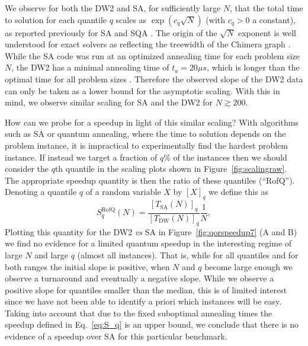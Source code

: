 We observe for both the DW2 and SA, for sufficiently large $N$, that the total time to solution for each quantile $q$ scales as $\exp(c_q\sqrt{N})$ (with $c_q>0$ a constant), as reported previously for SA and SQA \cite{ourpaper}. The origin of the $\sqrt{N}$ exponent is well understood for exact solvers as reflecting the treewidth of the Chimera graph \cite{SM,Choi2}. While the SA code was run at an optimized annealing time for each problem size $N$, the DW2 has a minimal annealing time of $t_a=20\mu s$, which is longer than the optimal time for all problem sizes \cite{SM}. Therefore the observed slope of the DW2 data can only be taken as a lower bound for the asymptotic scaling. With this in mind, we observe similar scaling for SA and the DW2 for $N\gtrsim 200$.

How can we probe for a speedup in light of this similar scaling? With algorithms such as SA or quantum annealing, where the time to solution depends on the problem instance, it is impractical to experimentally find the hardest problem instance. If instead we target a fraction of $q$\% of the instances then we should consider the $q$th quantile in the scaling plots shown in Figure~\ref{fig:scalingraw}. The appropriate speedup quantity is then the ratio of these quantiles (``RofQ''). Denoting a quantile $q$ of a random variable $X$ by $[X]_q$ we define this as
\begin{equation}
S^{\textrm{RofQ}}_q(N) = 
\frac{[T_{\textrm{SA}}(N)]_q}{[T_{\textrm{DW}}(N)]_q}  \frac{1}{N} ,
\label{eq:S_q}
\end{equation}
Plotting this quantity for the DW2 \textit{vs} SA in Figure~\ref{fig:qorspeedup7} (A and B) we find no evidence for a limited quantum speedup in the interesting regime of large $N$ and large $q$ (almost all instances). That is, while for all quantiles and for both ranges the initial slope is positive, when $N$ and $q$ become large enough we observe a turnaround and eventually a negative slope. While we observe a positive slope for quantiles smaller than the median, this is of limited interest since we have not been able to identify a priori which instances will be easy. Taking into account that due to the fixed suboptimal annealing times the speedup defined in Eq.~\eqref{eq:S_q} is an upper bound, we conclude that there is no evidence of a speedup over SA for this particular benchmark.


